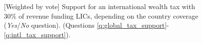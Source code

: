 \begin{figure}[h!]
    \caption[{[}Weighted by vote{]} Support for an int'l wealth tax depending on coverage]{[Weighted by vote] Support for an international wealth tax with 30\% of revenue funding LICs, depending on the country coverage (\textit{Yes}/\textit{No} question). \hfill (Questions \ref{q:global_tax_support}-\ref{q:intl_tax_support}).
    }\label{fig:wealth_tax_weight_vote}
\end{figure}


